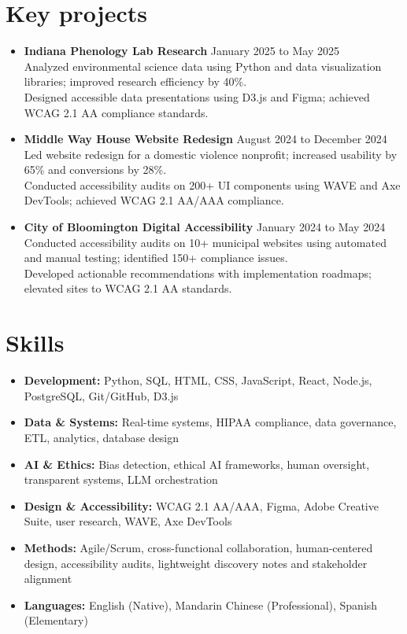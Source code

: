 \documentclass[11pt]{article}
\begin{document}
\section*{Key projects}
\begin{itemize}[leftmargin=*]
    \item \textbf{Indiana Phenology Lab Research} \hfill January 2025 to May 2025\\
    Analyzed environmental science data using Python and data visualization libraries; improved research efficiency by 40\%.\\
    Designed accessible data presentations using D3.js and Figma; achieved WCAG 2.1 AA compliance standards.

    \item \textbf{Middle Way House Website Redesign} \hfill August 2024 to December 2024\\
    Led website redesign for a domestic violence nonprofit; increased usability by 65\% and conversions by 28\%.\\
    Conducted accessibility audits on 200+ UI components using WAVE and Axe DevTools; achieved WCAG 2.1 AA/AAA compliance.

    \item \textbf{City of Bloomington Digital Accessibility} \hfill January 2024 to May 2024\\
    Conducted accessibility audits on 10+ municipal websites using automated and manual testing; identified 150+ compliance issues.\\
    Developed actionable recommendations with implementation roadmaps; elevated sites to WCAG 2.1 AA standards.
\end{itemize}

\section*{Skills}
\begin{itemize}[leftmargin=*]
    \item \textbf{Development:} Python, SQL, HTML, CSS, JavaScript, React, Node.js, PostgreSQL, Git/GitHub, D3.js
    \item \textbf{Data \& Systems:} Real-time systems, HIPAA compliance, data governance, ETL, analytics, database design
    \item \textbf{AI \& Ethics:} Bias detection, ethical AI frameworks, human oversight, transparent systems, LLM orchestration
    \item \textbf{Design \& Accessibility:} WCAG 2.1 AA/AAA, Figma, Adobe Creative Suite, user research, WAVE, Axe DevTools
    \item \textbf{Methods:} Agile/Scrum, cross-functional collaboration, human-centered design, accessibility audits, lightweight discovery notes and stakeholder alignment
    \item \textbf{Languages:} English (Native), Mandarin Chinese (Professional), Spanish (Elementary)
\end{itemize}
\end{document}
